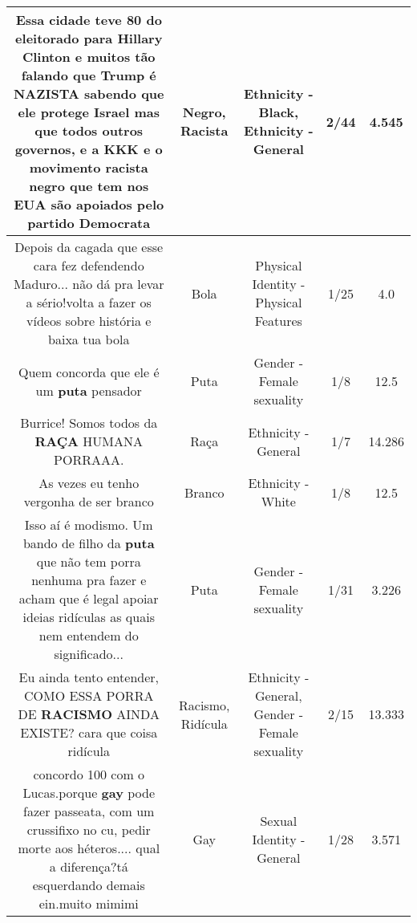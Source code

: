 \documentclass[11pt]{article}
\newlength\mylength
\begin{document}
\begin{center}
\begin{longtable}{|C{.65\mylength}|C{.30\mylength}|C{.12\mylength}|C{.12\mylength}|C{.12\mylength}|}
  \small Essa cidade teve 80 do eleitorado para Hillary Clinton e muitos tão falando que Trump é NAZISTA sabendo que ele protege Israel mas que todos outros governos, e a KKK e o movimento \textbf{racista} \textbf{negro} que tem nos EUA são apoiados pelo partido Democrata\normalsize   & Negro, Racista & Ethnicity - Black, Ethnicity - General & 2/44 & 4.545 \\  \hline
  \small Depois da cagada que esse cara fez defendendo Maduro... não dá pra levar a sério!volta a fazer os vídeos sobre história e baixa tua bola\normalsize   & Bola & Physical Identity - Physical Features & 1/25 & 4.0 \\  \hline
  \small Quem concorda que ele é um \textbf{puta} pensador\normalsize   & Puta & Gender - Female sexuality & 1/8 & 12.5 \\  \hline
  \small Burrice! Somos todos da \textbf{RAÇA} HUMANA PORRAAA.\normalsize   & Raça & Ethnicity - General & 1/7 & 14.286 \\  \hline
  \small As vezes eu tenho vergonha de ser branco\normalsize   & Branco & Ethnicity - White & 1/8 & 12.5 \\  \hline
  \small Isso aí é modismo. Um bando de filho da \textbf{puta} que não tem porra nenhuma pra fazer e acham que é legal apoiar ideias ridículas as quais nem entendem do significado...\normalsize   & Puta & Gender - Female sexuality & 1/31 & 3.226 \\  \hline
  \small Eu ainda tento entender, COMO ESSA PORRA DE \textbf{RACISMO} AINDA EXISTE? cara que coisa ridícula\normalsize   & Racismo, Ridícula & Ethnicity - General, Gender - Female sexuality & 2/15 & 13.333 \\  \hline
  \small concordo 100 com o Lucas.porque \textbf{gay} pode fazer passeata, com um crussifixo no cu, pedir morte aos héteros.... qual a diferença?tá esquerdando demais ein.muito mimimi\normalsize   & Gay & Sexual Identity - General & 1/28 & 3.571 \\  \hline

\end{longtable}
\end{center}
\end{document}
